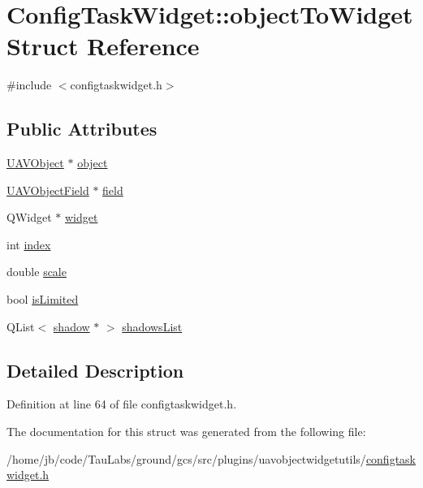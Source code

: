\hypertarget{struct_config_task_widget_1_1object_to_widget}{\section{\-Config\-Task\-Widget\-:\-:object\-To\-Widget \-Struct \-Reference}
\label{struct_config_task_widget_1_1object_to_widget}
}


{\ttfamily \#include $<$configtaskwidget.\-h$>$}

\subsection*{\-Public \-Attributes}
\begin{DoxyCompactItemize}
\item 
\hyperlink{class_u_a_v_object}{\-U\-A\-V\-Object} $\ast$ \hyperlink{group___u_a_v_object_widget_utils_ga0a7a2adb310cdc6b0301dfad762a4f30}{object}
\item 
\hyperlink{class_u_a_v_object_field}{\-U\-A\-V\-Object\-Field} $\ast$ \hyperlink{group___u_a_v_object_widget_utils_ga36fdb22e759e0beae23ae99b03becb68}{field}
\item 
\-Q\-Widget $\ast$ \hyperlink{group___u_a_v_object_widget_utils_gac3c3016bdfda2c16ec8e356dd1a0882d}{widget}
\item 
int \hyperlink{group___u_a_v_object_widget_utils_ga32127d63078e835a69c50d20ea1a678b}{index}
\item 
double \hyperlink{group___u_a_v_object_widget_utils_ga7981e8bb575a90d2a1491fd792108efe}{scale}
\item 
bool \hyperlink{group___u_a_v_object_widget_utils_ga22163ec4275b9b06770d4caead750ee4}{is\-Limited}
\item 
\-Q\-List$<$ \hyperlink{struct_config_task_widget_1_1shadow}{shadow} $\ast$ $>$ \hyperlink{group___u_a_v_object_widget_utils_ga720684f6824db0612bacf1e3769c4ef3}{shadows\-List}
\end{DoxyCompactItemize}


\subsection{\-Detailed \-Description}


\-Definition at line 64 of file configtaskwidget.\-h.



\-The documentation for this struct was generated from the following file\-:\begin{DoxyCompactItemize}
\item 
/home/jb/code/\-Tau\-Labs/ground/gcs/src/plugins/uavobjectwidgetutils/\hyperlink{configtaskwidget_8h}{configtaskwidget.\-h}\end{DoxyCompactItemize}
